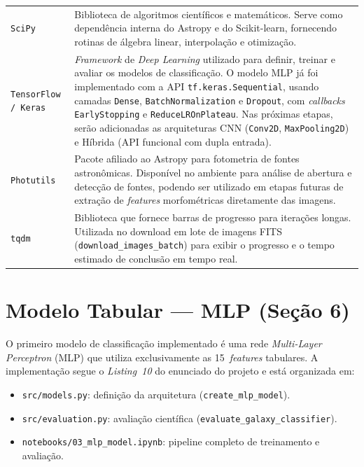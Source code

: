 \documentclass[12pt, a4paper]{article}
\begin{document}
\begin{longtable}{lp{10.5cm}}
  \texttt{SciPy}
  & Biblioteca de algoritmos científicos e matemáticos. Serve como
    dependência interna do Astropy e do Scikit-learn, fornecendo rotinas
    de álgebra linear, interpolação e otimização. \\[6pt]

  \texttt{TensorFlow / Keras}
  & \textit{Framework} de \textit{Deep Learning} utilizado para definir,
    treinar e avaliar os modelos de classificação. O modelo MLP já foi
    implementado com a API \texttt{tf.keras.Sequential}, usando camadas
    \texttt{Dense}, \texttt{BatchNormalization} e \texttt{Dropout}, com
    \textit{callbacks} \texttt{EarlyStopping} e
    \texttt{ReduceLROnPlateau}. Nas próximas etapas, serão adicionadas
    as arquiteturas CNN (\texttt{Conv2D}, \texttt{MaxPooling2D}) e
    Híbrida (API funcional com dupla entrada). \\[6pt]

  \texttt{Photutils}
  & Pacote afiliado ao Astropy para fotometria de fontes astronômicas.
    Disponível no ambiente para análise de abertura e detecção de fontes,
    podendo ser utilizado em etapas futuras de extração de
    \textit{features} morfométricas diretamente das imagens. \\[6pt]

  \texttt{tqdm}
  & Biblioteca que fornece barras de progresso para iterações longas.
    Utilizada no download em lote de imagens FITS
    (\texttt{download\_images\_batch}) para exibir o progresso e o tempo
    estimado de conclusão em tempo real. \\

\end{longtable}

\section{Modelo Tabular --- MLP (Seção 6)}

O primeiro modelo de classificação implementado é uma rede
\textit{Multi-Layer Perceptron} (MLP) que utiliza exclusivamente as
15~\textit{features} tabulares. A implementação segue o \textit{Listing~10}
do enunciado do projeto e está organizada em:
\begin{itemize}[leftmargin=2em]
  \item \texttt{src/models.py}: definição da arquitetura
        (\texttt{create\_mlp\_model}).
  \item \texttt{src/evaluation.py}: avaliação científica
        (\texttt{evaluate\_galaxy\_classifier}).
  \item \texttt{notebooks/03\_mlp\_model.ipynb}: pipeline completo de
        treinamento e avaliação.
\end{itemize}
\end{document}
